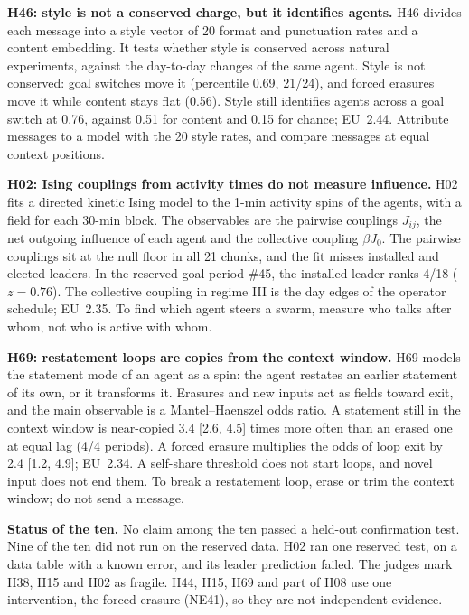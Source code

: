 \textbf{H46: style is not a conserved charge, but it identifies agents.}
H46 divides each message into a style vector of 20 format and punctuation rates and a content embedding. It tests whether style is conserved across natural experiments, against the day-to-day changes of the same agent. Style is not conserved: goal switches move it (percentile 0.69, 21/24), and forced erasures move it while content stays flat (0.56). Style still identifies agents across a goal switch at 0.76, against 0.51 for content and 0.15 for chance; EU~2.44. Attribute messages to a model with the 20 style rates, and compare messages at equal context positions.

\textbf{H02: Ising couplings from activity times do not measure influence.}
H02 fits a directed kinetic Ising model to the 1-min activity spins of the agents, with a field for each 30-min block. The observables are the pairwise couplings $J_{ij}$, the net outgoing influence of each agent and the collective coupling $\beta J_0$. The pairwise couplings sit at the null floor in all 21 chunks, and the fit misses installed and elected leaders. In the reserved goal period \#45, the installed leader ranks 4/18 ($z=0.76$). The collective coupling in regime III is the day edges of the operator schedule; EU~2.35. To find which agent steers a swarm, measure who talks after whom, not who is active with whom.

\textbf{H69: restatement loops are copies from the context window.}
H69 models the statement mode of an agent as a spin: the agent restates an earlier statement of its own, or it transforms it. Erasures and new inputs act as fields toward exit, and the main observable is a Mantel--Haenszel odds ratio. A statement still in the context window is near-copied 3.4 [2.6, 4.5] times more often than an erased one at equal lag (4/4 periods). A forced erasure multiplies the odds of loop exit by 2.4 [1.2, 4.9]; EU~2.34. A self-share threshold does not start loops, and novel input does not end them. To break a restatement loop, erase or trim the context window; do not send a message.

\textbf{Status of the ten.} No claim among the ten passed a held-out confirmation test. Nine of the ten did not run on the reserved data. H02 ran one reserved test, on a data table with a known error, and its leader prediction failed. The judges mark H38, H15 and H02 as fragile. H44, H15, H69 and part of H08 use one intervention, the forced erasure (NE41), so they are not independent evidence.
